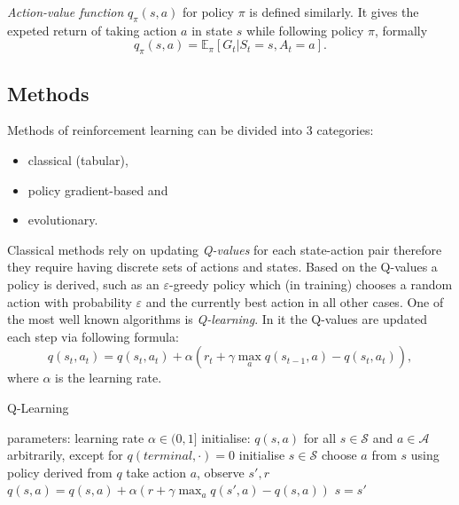 \emph{Action-value function} $q_\pi(s,a)$ for policy $\pi$ is defined similarly. It gives the expeted return of taking action $a$ in state $s$ while following policy $\pi$, formally
\begin{equation}
    q_\pi(s,a) = \mathbb{E}_\pi[G_t|S_t=s, A_t=a].
\end{equation}
\subsection{Methods}
Methods of reinforcement learning can be divided into 3 categories\cite{Sehnke2012}: \begin{itemize}
    \item classical (tabular),
    \item policy gradient-based and
    \item evolutionary.
\end{itemize}

Classical methods rely on updating \emph{Q-values} for each state-action pair therefore they require having discrete sets of actions and states. Based on the Q-values a policy is derived, such as an $\varepsilon$-greedy policy which (in training) chooses a random action with probability $\varepsilon$ and the currently best action in all other cases. One of the most well known algorithms is \emph{Q-learning}. In it the Q-values are updated each step via following formula:
\begin{equation}
    q(s_t,a_t) = q(s_t,a_t) + \alpha \left( r_t+\gamma \max_a q(s_{t-1},a)-q(s_t,a_t)\right), 
\end{equation}
where $\alpha$ is the learning rate.

\begin{algorithm}[h]
    \begin{algorithmic}[1]
    \caption{Q-Learning}
    \label{alg:q-learning}
        \State parameters: learning rate $\alpha \in (0,1]$ 
        \State initialise: $q(s,a)$ for all $s\in\mathcal{S}$ and $a\in \mathcal{A}$ arbitrarily, except for $q(terminal, \cdot) = 0$ 
            \State initialise $s\in\mathcal{S}$
            \Repeat
                \State choose $a$ from $s$ using policy derived from $q$
                \State take action $a$, observe $s', r$
                \State $q(s,a) = q(s,a) + \alpha \left( r+\gamma \max_a q(s',a)-q(s,a)\right)$
                \State $s = s'$
        \EndFor
    \end{algorithmic}
\end{algorithm}

